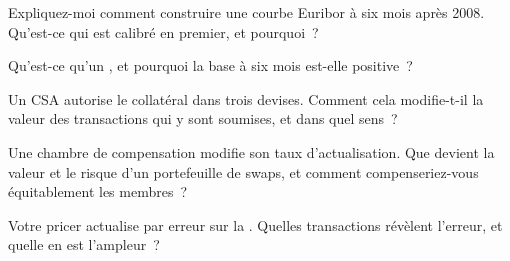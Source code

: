 \begin{interviewq}\label{iq:rc:multi-curve-and-collateral-discounting:2}
Expliquez-moi comment construire une courbe Euribor à six mois après 2008.
Qu'est-ce qui est calibré en premier, et pourquoi~?
\end{interviewq}

\begin{interviewq}\label{iq:rc:multi-curve-and-collateral-discounting:3}
Qu'est-ce qu'un , et pourquoi la base à six mois est-elle positive~?
\end{interviewq}

\begin{interviewq}\label{iq:rc:multi-curve-and-collateral-discounting:4}
Un CSA autorise le collatéral dans trois devises. Comment cela modifie-t-il la valeur
des transactions qui y sont soumises, et dans quel sens~?
\end{interviewq}

\begin{interviewq}\label{iq:rc:multi-curve-and-collateral-discounting:5}
Une chambre de compensation modifie son taux d'actualisation. Que devient la valeur
et le risque d'un portefeuille de swaps, et comment compenseriez-vous équitablement les membres~?
\end{interviewq}

\begin{interviewq}\label{iq:rc:multi-curve-and-collateral-discounting:6}
Votre pricer actualise par erreur sur la . Quelles transactions
révèlent l'erreur, et quelle en est l'ampleur~?
\end{interviewq}

